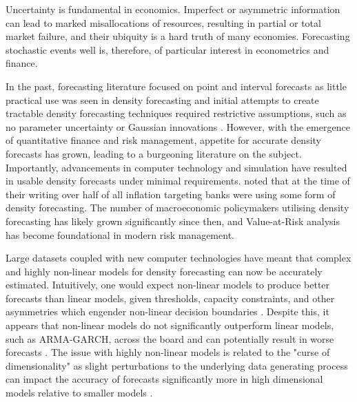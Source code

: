 Uncertainty is fundamental in economics. Imperfect or asymmetric information can lead to marked misallocations of resources, resulting in partial or total market failure, and their ubiquity is a hard truth of many economies. Forecasting stochastic events well is, therefore, of particular interest in econometrics and finance.

In the past, forecasting literature focused on point and interval forecasts as little practical use was seen in density forecasting and initial attempts to create tractable density forecasting techniques required restrictive assumptions, such as no parameter uncertainty or Gaussian innovations \citep{DieGunTay}. However, with the emergence of quantitative finance and risk management, appetite for accurate density forecasts has grown, leading to a burgeoning literature on the subject. Importantly, advancements in computer technology and simulation have resulted in usable density forecasts under minimal requirements. \citet{BOERO2004305} noted that at the time of their writing over half of all inflation targeting banks were using some form of density forecasting. The number of macroeconomic policymakers utilising density forecasting has likely grown significantly since then, and Value-at-Risk analysis has become foundational in modern risk management. 

Large datasets coupled with new computer technologies have meant that complex and highly non-linear models for density forecasting can now be accurately estimated. Intuitively, one would expect non-linear models to produce better forecasts than linear models, given thresholds, capacity constraints, and other asymmetries which engender non-linear decision boundaries \citep{DAHL2004201}. Despite this, it appears that non-linear models do not significantly outperform linear models, such as ARMA-GARCH, across the board and can potentially result in worse forecasts \citep{DEGOOIJER,CLEMENTS2004169}. The issue with highly non-linear models is related to the "curse of dimensionality" as slight perturbations to the underlying data generating process can impact the accuracy of forecasts significantly more in high dimensional models relative to smaller models \citep{diakonikolas2018robust}.

